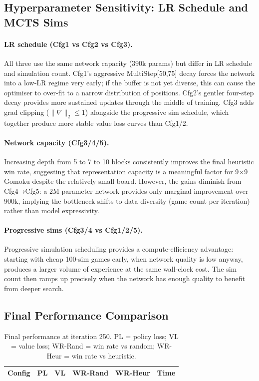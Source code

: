 \documentclass[11pt,a4paper]{article}
\begin{document}
\subsection{Hyperparameter Sensitivity: LR Schedule and MCTS Sims}

\paragraph{LR schedule (Cfg1 vs Cfg2 vs Cfg3).}
All three use the same network capacity ($390$k params) but differ in LR
schedule and simulation count.  Cfg1's aggressive MultiStep[50,75] decay forces
the network into a low-LR regime very early; if the buffer is not yet diverse,
this can cause the optimiser to over-fit to a narrow distribution of positions.
Cfg2's gentler four-step decay provides more sustained updates through the middle
of training.  Cfg3 adds grad clipping ($\|\nabla\|_2 \le 1$) alongside the
progressive sim schedule, which together produce more stable value loss curves
than Cfg1/2.

\paragraph{Network capacity (Cfg3/4/5).}
Increasing depth from 5 to 7 to 10 blocks consistently improves the final
heuristic win rate, suggesting that representation capacity is a meaningful
factor for 9×9 Gomoku despite the relatively small board.  However, the gains
diminish from Cfg4→Cfg5: a 2M-parameter network provides only marginal
improvement over 900k, implying the bottleneck shifts to data diversity
(game count per iteration) rather than model expressivity.

\paragraph{Progressive sims (Cfg3/4 vs Cfg1/2/5).}
Progressive simulation scheduling provides a compute-efficiency advantage:
starting with cheap 100-sim games early, when network quality is low anyway,
produces a larger volume of experience at the same wall-clock cost.  The sim
count then ramps up precisely when the network has enough quality to benefit from
deeper search.

\subsection{Final Performance Comparison}

\begin{table}[h]
\centering
\caption{Final performance at iteration 250. PL = policy loss; VL = value loss;
WR-Rand = win rate vs random; WR-Heur = win rate vs heuristic.}
\label{tab:results}
\begin{tabular}{lrrrrr}
\toprule
\textbf{Config} & \textbf{PL} & \textbf{VL} & \textbf{WR-Rand}
                & \textbf{WR-Heur} & \textbf{Time} \\
\midrule
\end{tabular}
\end{table}
\end{document}
